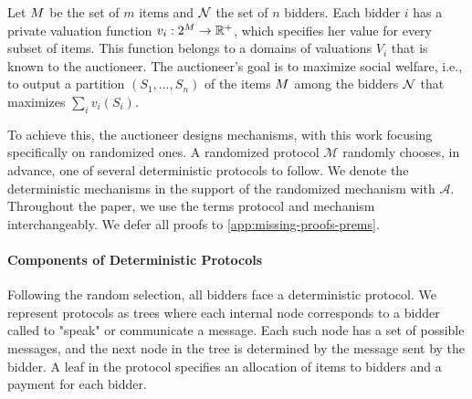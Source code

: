 Let $M$ be the set of $m$ items and $\mathcal{N}$ the set of $n$ bidders. Each bidder $i$ has a private valuation function $v_i: 2^{M} \to \mathbb{R}^{+}$, which specifies her value for every subset of items. This function belongs to a domains of valuations  $V_i$ that is known to the auctioneer.  
The auctioneer's goal is to maximize social welfare, i.e., to output a partition $(S_1, \dots, S_n)$ of the items $M$ among the bidders $\mathcal{N}$ that maximizes $\sum_i v_i(S_i)$.



To achieve this, the auctioneer designs mechanisms, with this work focusing specifically on randomized ones.
A randomized protocol $\mathcal M$ randomly chooses, in advance, one of several deterministic protocols to follow. We denote the deterministic mechanisms in the support of the randomized mechanism with $\mathcal A$.
Throughout the paper, we use the terms protocol and mechanism interchangeably.
We defer all proofs to \cref{app:missing-proofs-prems}. 

\paragraph{Components of Deterministic Protocols} Following the random selection, all bidders face a deterministic protocol.
We represent protocols as trees where each internal node corresponds to a bidder called to "speak" or communicate a message.
Each such node has a set of possible messages, and the next node in the tree is determined by the message sent by the bidder. 
A leaf in the protocol specifies an allocation of items to bidders and a payment for each bidder.

